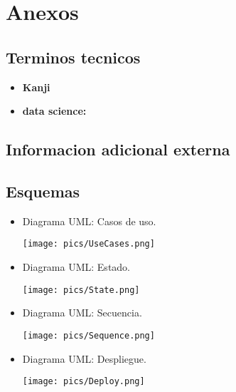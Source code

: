 \documentclass{article}
\begin{document}
\newpage



\section{Anexos}

\subsection{Terminos tecnicos}
\begin{itemize}
    \item \textbf{Kanji}
    \item \textbf{data science:}
\end{itemize}

\subsection{Informacion adicional externa}

\subsection{Esquemas}

\begin{itemize}
    \item Diagrama UML: Casos de uso.
    \begin{center}
        \centering 
        \texttt{[image: pics/UseCases.png]}
    \end{center}
    \item Diagrama UML: Estado.
    \begin{center}
        \centering 
        \texttt{[image: pics/State.png]}
    \end{center}
    \item Diagrama UML: Secuencia.
    \begin{center}
        \centering 
        \texttt{[image: pics/Sequence.png]}
    \end{center}
    \item Diagrama UML: Despliegue.
    \begin{center}
        \centering 
        \texttt{[image: pics/Deploy.png]}
    \end{center}
    
\end{itemize}
\end{document}
